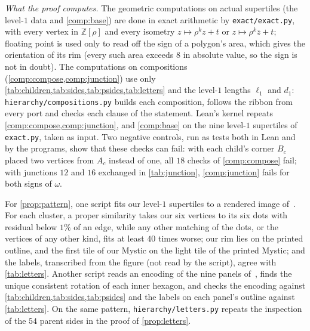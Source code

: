 \documentclass[11pt]{amsart}
\theoremstyle{definition}
\theoremstyle{remark}
\newcommand{\ZZ}{\mathbb Z}
\newcommand{\code}[1]{\texttt{#1}}
\begin{document}
\emph{What the proof computes.} The geometric computations on actual supertiles (the level-$1$ data and
\cref{comp:base}) are done in exact arithmetic by \code{exact/exact.py}, with every vertex in $\ZZ[\rho]$ and every
isometry $z\mapsto\rho^kz+t$ or $z\mapsto\rho^k\bar z+t$; floating point is used only to read off the sign of a polygon's area, which gives the
orientation of its rim (every such area exceeds $8$ in absolute value, so the sign is not in doubt). The computations
on compositions (\cref{comp:compose,comp:junction}) use only \cref{tab:children,tab:sides,tab:psides,tab:letters} and
the level-$1$ lengths $\ell_1$ and $d_1$: \code{hierarchy/compositions.py} builds each composition, follows the ribbon
from every port and checks each clause of the statement. Lean's kernel repeats
\cref{comp:compose,comp:junction}, and \cref{comp:base} on the nine level-$1$ supertiles of \code{exact.py}, taken as
input. Two negative controls, run as tests both in Lean and by the programs, show
that these checks can fail: with each child's corner $B_c$ placed two vertices from $A_c$ instead of one, all $18$
checks of \cref{comp:compose} fail; with junctions $12$ and $16$ exchanged in \cref{tab:junction}, \cref{comp:junction}
fails for both signs of $\omega$.

For \cref{prop:pattern}, one script fits our level-$1$ supertiles to a rendered image
of~\cite[Fig.~4.1]{SMKGS-spectre}. For each cluster, a proper similarity takes our six vertices to its six dots with
residual below $1\%$ of an edge, while any other matching of the dots, or the vertices of any other kind, fits at least
$40$ times worse; our rim lies on the printed outline, and the first tile of our Mystic on the light tile of the
printed Mystic; and the labels, transcribed from the figure (not read by the script), agree with \cref{tab:letters}.
Another script reads an encoding of the nine panels of~\cite[Fig.~5.1]{SMKGS-spectre}, finds the unique consistent
rotation of each inner hexagon, and checks the encoding against \cref{tab:children,tab:sides,tab:psides} and the labels
on each panel's outline against \cref{tab:letters}. On the same pattern, \code{hierarchy/letters.py} repeats the
inspection of the $54$ parent sides in the proof of \cref{prop:letters}.
\end{document}
